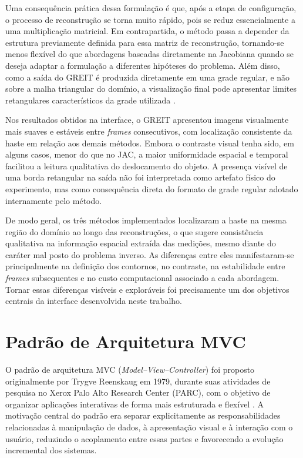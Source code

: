 Uma consequência prática dessa formulação é que, após a etapa de configuração, o processo de reconstrução se torna muito rápido, pois se reduz essencialmente a uma multiplicação matricial. Em contrapartida, o método passa a depender da estrutura previamente definida para essa matriz de reconstrução, tornando-se menos flexível do que abordagens baseadas diretamente na Jacobiana quando se deseja adaptar a formulação a diferentes hipóteses do problema. Além disso, como a saída do GREIT é produzida diretamente em uma grade regular, e não sobre a malha triangular do domínio, a visualização final pode apresentar limites retangulares característicos da grade utilizada \cite{pyEITReadme}.

Nos resultados obtidos na interface, o GREIT apresentou imagens visualmente mais suaves e estáveis entre \textit{frames} consecutivos, com localização consistente da haste em relação aos demais métodos. Embora o contraste visual tenha sido, em alguns casos, menor do que no JAC, a maior uniformidade espacial e temporal facilitou a leitura qualitativa do deslocamento do objeto. A presença visível de uma borda retangular na saída não foi interpretada como artefato físico do experimento, mas como consequência direta do formato de grade regular adotado internamente pelo método.

De modo geral, os três métodos implementados localizaram a haste na mesma região do domínio ao longo das reconstruções, o que sugere consistência qualitativa na informação espacial extraída das medições, mesmo diante do caráter mal posto do problema inverso. As diferenças entre eles manifestaram-se principalmente na definição dos contornos, no contraste, na estabilidade entre \textit{frames} subsequentes e no custo computacional associado a cada abordagem. Tornar essas diferenças visíveis e exploráveis foi precisamente um dos objetivos centrais da interface desenvolvida neste trabalho. 

\section{Padrão de Arquitetura MVC}
\label{sec:mvc}

O padrão de arquitetura MVC (\textit{Model--View--Controller}) foi proposto originalmente por Trygve Reenskaug em 1979, durante suas atividades de pesquisa no Xerox Palo Alto Research Center (PARC), com o objetivo de organizar aplicações interativas de forma mais estruturada e flexível \cite{Reenskaug1979}. A motivação central do padrão era separar explicitamente as responsabilidades relacionadas à manipulação de dados, à apresentação visual e à interação com o usuário, reduzindo o acoplamento entre essas partes e favorecendo a evolução incremental dos sistemas.

